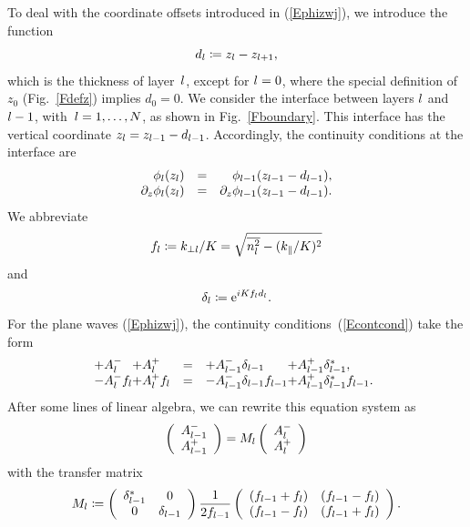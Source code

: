 To deal with the coordinate offsets introduced in (\ref{Ephizwj}),
we introduce the function%
\begin{equation}
  d_l\coloneqq z_{l}-z_{l+1},
\end{equation}
which is the thickness of layer~$l$,
except for $l=0$,
where the special definition of $z_0$ (Fig.~\ref{Fdefz}) implies $d_0=0$.
We consider the interface between layers $l$ and $l-1$,
with~$l=1,\ldots,N$, as shown in Fig.~\ref{Fboundary}.
This interface has the vertical coordinate $z_{l}=z_{l-1}-d_{l-1}$.
Accordingly, the continuity conditions at the interface are
\begin{equation}\label{Econtcond}
  \begin{array}{lcl}
 \hphantom{\partial_z}\phi_{l}(z_{l}) &=& \hphantom{\partial_z}\phi_{l-1}(z_{l-1}-d_{l-1}),\\
           \partial_z \phi_{l}(z_{l}) &=&           \partial_z \phi_{l-1}(z_{l-1}-d_{l-1}).
  \end{array}
\end{equation}
We abbreviate
\begin{equation}
  f_l \coloneqq  k_{\perp l}/K = \sqrt{\overline{n_l^2}-(k_\parallel/K)^2}
\end{equation}
and
\begin{equation}
   \delta_l \coloneqq  \text{e}^{iKf_l d_l}.
\end{equation}
For the plane waves (\ref{Ephizwj}),
the continuity conditions~(\ref{Econtcond}) take the form
\begin{equation}\label{Econt2}
  \begin{array}{@{}l@{}lcl@{}l}
  +A^-_{\il} &+A^+_{\il}
  &=&
  +A^-_{\il-1}\delta_{\il-1} &+A^+_{\il-1}\delta_{\il-1}^*,
  \\
  -A^-_{\il} f_{\il}  &+A^+_{\il} f_{\il}
  &=&
  -A^-_{\il-1}\delta_{\il-1} f_{\il-1} &+A^+_{\il-1}\delta_{\il-1}^* f_{\il-1}.
  \end{array}
\end{equation}
After some lines of linear algebra,
we can rewrite this equation system as
\begin{equation}\label{EcMc}
  \left( \begin{array}{c}A^-_{l-1}\\ A^+_{l-1}\end{array} \right)
  = M_{l} \left( \begin{array}{c}A^-_{l}\\A^+_{l}\end{array} \right)
\end{equation}
with the transfer matrix
\begin{equation}\label{EMil}
  M_l
   \coloneqq
   \left(\begin{array}{cc}
       \delta_{l-1}^*&0\\
       0 & \delta_{l-1}
   \end{array}\right)
   \frac{1}{2f_{l-1}}
   \left(\begin{array}{cc}
       (f_{l-1}+f_{l})&(f_{l-1}-f_{l})\\
       (f_{l-1}-f_{l})&(f_{l-1}+f_{l})
   \end{array}\right).
\end{equation}

